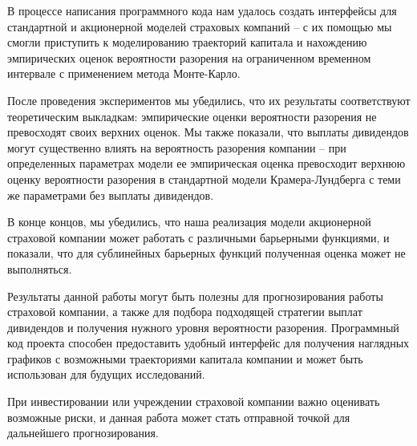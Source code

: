 \documentclass{article}
\theoremstyle{plain}
\theoremstyle{plain}
\theoremstyle{plain}
\theoremstyle{plain}
\theoremstyle{definition}
\theoremstyle{remark}
\begin{document}
В процессе написания программного кода нам удалось создать интерфейсы для стандартной и акционерной моделей страховых компаний -- с их помощью мы смогли приступить к моделированию траекторий капитала и нахождению эмпирических оценок вероятности разорения на ограниченном временном интервале с применением метода Монте-Карло.

После проведения экспериментов мы убедились, что их результаты соответствуют теоретическим выкладкам: эмпирические оценки вероятности разорения не превосходят своих верхних оценок. Мы также показали, что выплаты дивидендов могут существенно влиять на вероятность разорения компании -- при определенных параметрах модели ее эмпирическая оценка превосходит верхнюю оценку вероятности разорения в стандартной модели Крамера-Лундберга с теми же параметрами без выплаты дивидендов.

В конце концов, мы убедились, что наша реализация модели акционерной страховой компании может работать с различными барьерными функциями, и показали, что для сублинейных барьерных функций полученная оценка может не выполняться.

Результаты данной работы могут быть полезны для прогнозирования работы страховой компании, а также для подбора подходящей стратегии выплат дивидендов и получения нужного уровня вероятности разорения. Программный код проекта способен предоставить удобный интерфейс для получения наглядных графиков с возможными траекториями капитала компании и может быть использован для будущих исследований.

При инвестировании или учреждении страховой компании важно оценивать возможные риски, и данная работа может стать отправной точкой для дальнейшего прогнозирования.

\clearpage


\end{document}
